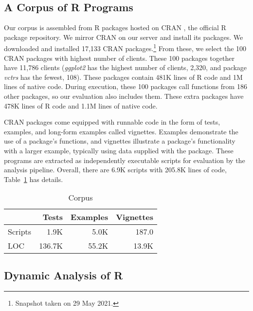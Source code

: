 \documentclass[10pt,review,sigplan,authorversion=true]{acmart}
\newcommand{\ggplot}{\textit{ggplot2}\xspace}
\newcommand{\vctrs}{\textit{vctrs}\xspace}
\begin{document}
\subsection{A Corpus of R Programs}

Our corpus is assembled from R packages hosted on CRAN \cite{ligges2017}, the
official R package repository. We mirror CRAN on our server and install its
packages. We downloaded and installed 17,133 CRAN packages.\footnote{Snapshot
taken on 29 May 2021.} From these, we select the 100 CRAN packages with highest
number of clients. These 100 packages together have 11,786 clients (\ggplot has
the highest number of clients, 2,320, and package \vctrs has the fewest, 108).
These packages contain 481K lines of R code and 1M lines of native code. During
execution, these 100 packages call functions from 186 other packages, so our
evaluation also includes them. These extra packages have 478K lines of R code
and 1.1M lines of native code.

CRAN packages come equipped with runnable code in the form of tests, examples,
and long-form examples called vignettes. Examples demonstrate the use of a
package's functions, and vignettes illustrate a package's functionality with a
larger example, typically using data supplied with the package. These programs
are extracted as independently executable scripts for evaluation by the analysis
pipeline. Overall, there are 6.9K scripts with 205.8K lines of code,
Table~\ref{table:corpus} has details.

\begin{table}[!h]   \small  \centering
  \caption{Corpus}\label{table:corpus}
  \vspace{-3mm}
  \begin{tabular}{lrrr}    \toprule
    &\bf Tests&\bf Examples&\bf Vignettes\\    \midrule
    {Scripts}&1.9K&5.0K&187.0\\    \midrule
    {LOC}&136.7K&55.2K&13.9K\\
    \bottomrule
  \end{tabular}
\end{table}

\subsection{Dynamic Analysis of R}
\end{document}
